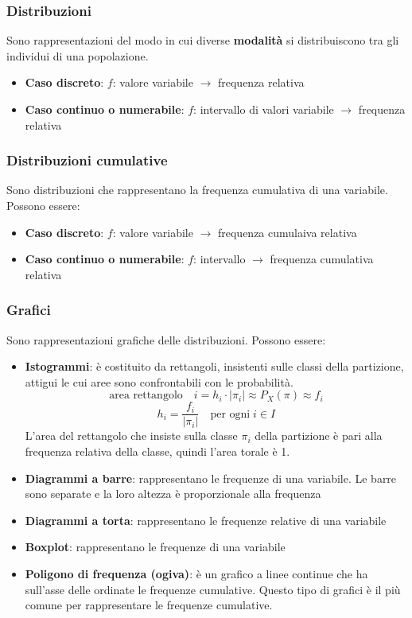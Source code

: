 \documentclass[a4paper]{article}
\theoremstyle{break}
\theoremstyle{break}
\theoremstyle{break}
\theoremstyle{break}
\begin{document}
\subsubsection{Distribuzioni}
Sono rappresentazioni del modo in cui diverse \textbf{modalità} si distribuiscono tra
gli individui di una popolazione.
\begin{itemize}
	\item \textbf{Caso discreto}: \( f \): valore variabile \( \to  \) frequenza relativa
	\item \textbf{Caso continuo o numerabile}: \( f \): intervallo di valori variabile \( \to  \) frequenza relativa
\end{itemize}

\subsubsection{Distribuzioni cumulative}
Sono distribuzioni che rappresentano la frequenza cumulativa di una variabile. Possono essere:
\begin{itemize}
	\item \textbf{Caso discreto}: \( f \): valore variabile \( \to  \) frequenza cumulaiva
	      relativa
	\item \textbf{Caso continuo o numerabile}: \( f \): intervallo \( \to  \) frequenza
	      cumulativa relativa
\end{itemize}

\subsubsection{Grafici}
Sono rappresentazioni grafiche delle distribuzioni. Possono essere:
\begin{itemize}
	\item \textbf{Istogrammi}: è costituito da rettangoli, insistenti sulle classi
	      della partizione, attigui le cui aree sono confrontabili con le probabilità.
	      \[
		      \text{area rettangolo} \quad i = h_i \cdot |\pi _i| \approx P_X(\pi ) \approx f_i
	      \]
	      \[
		      h_i = \frac{f_i}{|\pi _i|} \quad \text{per ogni} \; i \in I
	      \]
	      L'area del rettangolo che insiste sulla classe \( \pi_i  \) della partizione è pari
	      alla frequenza relativa della classe, quindi l'area torale è 1.
	\item \textbf{Diagrammi a barre}: rappresentano le frequenze di una variabile. Le barre
	      sono separate e la loro altezza è proporzionale alla frequenza
	\item \textbf{Diagrammi a torta}: rappresentano le frequenze relative di una variabile
	\item \textbf{Boxplot}: rappresentano le frequenze di una variabile
	\item \textbf{Poligono di frequenza (ogiva)}: è un grafico a linee continue che ha
	      sull'asse delle ordinate le frequenze cumulative. Questo tipo di grafici è il più comune
	      per rappresentare le frequenze cumulative.
\end{itemize}
\end{document}
